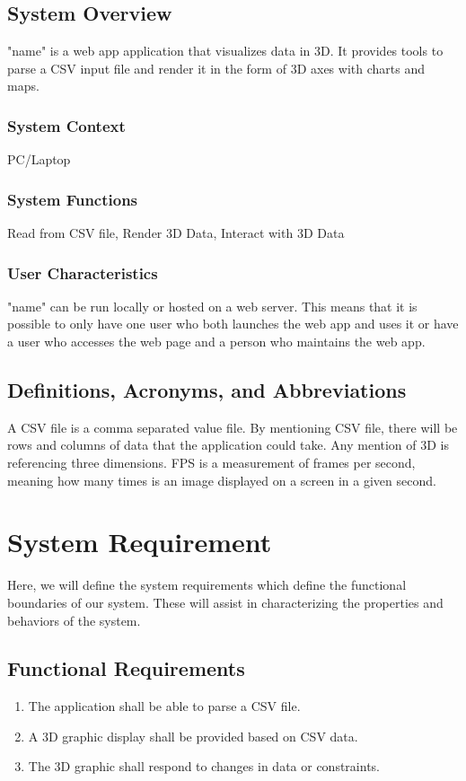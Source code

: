 \documentclass[letterpaper,10pt,titlepage, onecolumn, draftclsnofoot]{IEEEtran}
\begin{document}
    \subsection{System Overview}
    \noindent "name" is a web app application that visualizes data in 3D. It provides tools to parse a CSV input file and render it in the form of 3D axes with charts and maps.
        \subsubsection{System Context}
        PC/Laptop
        \subsubsection{System Functions}
        Read from CSV file, Render 3D Data, Interact with 3D Data
        \subsubsection{User Characteristics}
        "name" can be run locally or hosted on a web server. This means that it is possible to only have one user who both launches the web app and uses it or have a user who accesses the web page and a person who maintains the web app.

    \subsection{Definitions, Acronyms, and Abbreviations}
    \noindent A CSV file is a comma separated value file. By mentioning CSV file, there will be rows and columns of data that the application could take. Any mention of 3D is referencing three dimensions. FPS is a measurement of frames per second, meaning how many times is an image displayed on a screen in a given second.

\section{System Requirement}
\noindent Here, we will define the system requirements which define the functional boundaries of our system. These will assist in characterizing the properties and behaviors of the system.

    \subsection{Functional Requirements}
    \begin{enumerate}
        \item The application shall be able to parse a CSV file.
        \item A 3D graphic display shall be provided based on CSV data.
        \item The 3D graphic shall respond to changes in data or constraints.
    \end{enumerate}
    
\end{document}
